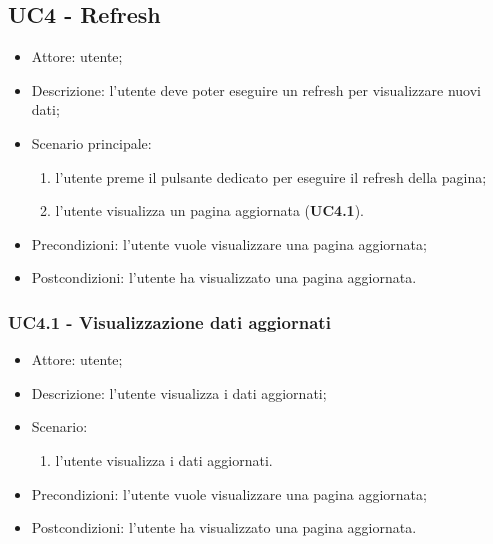     \subsection{UC4 - Refresh}
    \begin{itemize}
        \item Attore: utente;
        \item Descrizione: l'utente deve poter eseguire un refresh per visualizzare nuovi dati;
        \item Scenario principale:
            \begin{enumerate}
            \item l'utente preme il pulsante dedicato per eseguire il refresh della pagina;
            \item l'utente visualizza un pagina aggiornata (\textbf{UC4.1}).
            \end{enumerate}
        \item Precondizioni: l'utente vuole visualizzare una pagina aggiornata;
        \item Postcondizioni: l'utente ha visualizzato una pagina aggiornata.
    \end{itemize}

    \subsubsection{UC4.1 - Visualizzazione dati aggiornati}
    \begin{itemize}
        \item Attore: utente;
        \item Descrizione: l'utente visualizza i dati aggiornati;
        \item Scenario:
        \begin{enumerate}
        \item l'utente visualizza i dati aggiornati.
        \end{enumerate}
        \item Precondizioni: l'utente vuole visualizzare una pagina aggiornata;
        \item Postcondizioni: l'utente ha visualizzato una pagina aggiornata.
    \end{itemize}


